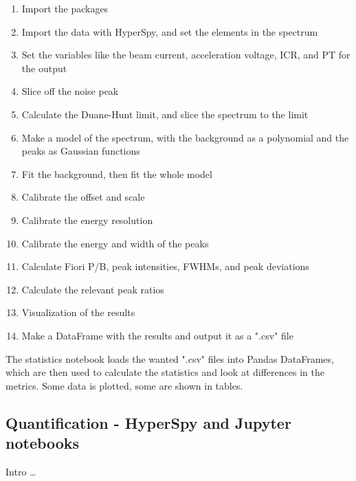 \begin{enumerate}
    \item Import the packages
    \item Import the data with HyperSpy, and set the elements in the spectrum
    \item Set the variables like the beam current, acceleration voltage, ICR, and PT for the output
    \item Slice off the noise peak
    \item Calculate the Duane-Hunt limit, and slice the spectrum to the limit
    \item Make a model of the spectrum, with the background as a polynomial and the peaks as Gaussian functions
    \item Fit the background, then fit the whole model
    \item Calibrate the offset and scale
    \item Calibrate the energy resolution
    \item Calibrate the energy and width of the peaks
    \item Calculate Fiori P/B, peak intensities, FWHMs, and peak deviations
    \item Calculate the relevant peak ratios
    \item Visualization of the results
    \item Make a DataFrame with the results and output it as a ".csv" file
\end{enumerate}



The statistics notebook loads the wanted ".csv" files into Pandas DataFrames, which are then used to calculate the statistics and look at differences in the metrics.
Some data is plotted, some are shown in tables.


























\subsection{Quantification - HyperSpy and Jupyter notebooks}
\label{method:data_treatment:quantification}


Intro \dots




